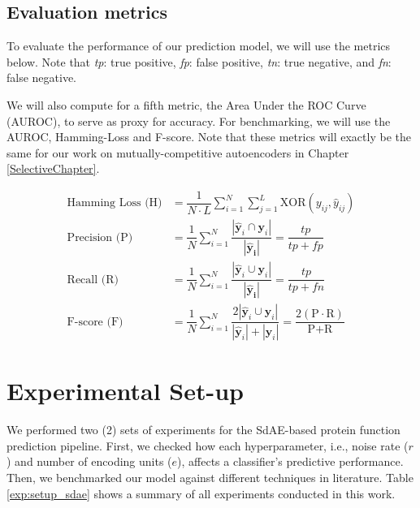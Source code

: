\subsection{Evaluation metrics}

To evaluate the performance of our prediction model, we will use the
metrics below. Note that \textit{tp}: true positive, \textit{fp}: false positive,
\textit{tn}: true negative, and \textit{fn}: false negative.

\par We will also compute for a fifth metric, the Area Under the ROC Curve
(AUROC), to serve as proxy for accuracy. For benchmarking, we will use the AUROC,
Hamming-Loss and F-score. Note that these metrics will exactly be the same for
our work on mutually-competitive autoencoders in Chapter \ref{SelectiveChapter}.

\begin{align}
    \text{Hamming Loss (H)} &= \dfrac{1}{N \cdot L} \sum_{i=1}^{N} \sum_{j=1}^{L}
    \text{XOR}(y_{ij}, \widehat{y}_{ij}) \\
    \text{Precision (P)} &=
    \dfrac{1}{N}\sum_{i=1}^{N}\dfrac{|\mathbf{\widehat{y}}_{i} \cap
    \mathbf{y}_{i}|}{|\mathbf{\widehat{y}_{i}}|} = \dfrac{tp}{tp + fp} \\
    \text{Recall (R)} &=
    \dfrac{1}{N}\sum_{i=1}^{N}\dfrac{|\mathbf{\widehat{y}}_{i} \cup
    \mathbf{y}_{i}|}{|\mathbf{\widehat{y}_{i}}|} = \dfrac{tp}{tp + fn} \\
    \text{F-score (F)} &=
    \dfrac{1}{N}\sum_{i=1}^{N} \dfrac{2 | \mathbf{\widehat{y}}_{i} \cup
        \mathbf{y}_{i}|}{|\mathbf{\widehat{y}}_{i} | + |\mathbf{y}_{i}|} =
        \dfrac{2 (\text{P} \cdot \text{R})}{\text{P} +
        \text{R}}
\end{align}


\section{Experimental Set-up}
\label{SDSetup}

\par We performed two (2) sets of experiments for the SdAE-based protein
function prediction pipeline. First, we checked how each hyperparameter,
i.e., noise rate ($r$) and number of encoding units ($e$), affects a
classifier's predictive performance. Then, we benchmarked our model against
different techniques in literature. Table \ref{exp:setup_sdae}
shows a summary of all experiments conducted in this work.

